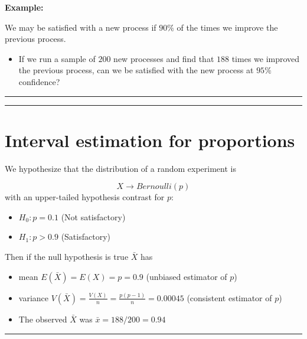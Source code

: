 \documentclass[
]{book}
\providecommand{\tightlist}{%
  \setlength{\itemsep}{0pt}\setlength{\parskip}{0pt}}
\begin{document}
\textbf{Example:}

We may be satisfied with a new process if \(90\%\) of the times we improve the previous process.

\begin{itemize}
\tightlist
\item
  If we run a sample of \(200\) new processes and find that \(188\) times we improved the previous process, can we be satisfied with the new process at \(95\%\) confidence?
\end{itemize}

\begin{center}\rule{0.5\linewidth}{0.5pt}\end{center}

\begin{center}\rule{0.5\linewidth}{0.5pt}\end{center}

\hypertarget{interval-estimation-for-proportions-4}{%
\section{Interval estimation for proportions}\label{interval-estimation-for-proportions-4}}

We hypothesize that the distribution of a random experiment is

\[X \rightarrow Bernoulli (p)\]
with an upper-tailed hypothesis contrast for \(p\):

\begin{itemize}
\tightlist
\item
  \(H_0: p=0.1\) (Not satisfactory)
\item
  \(H_1: p> 0.9\) (Satisfactory)
\end{itemize}

Then if the null hypothesis is true \(\bar{X}\) has

\begin{itemize}
\item
  mean \(E(\bar{X})=E(X)=p=0.9\) (unbiased estimator of \(p\))\\
\item
  variance \(V(\bar{X})=\frac{V(X)}{n}=\frac{p(p-1)}{n}=0.00045\) (consistent estimator of \(p\))
\item
  The observed \(\bar{X}\) was \(\bar{x}=188/200=0.94\)
\end{itemize}

\begin{center}\rule{0.5\linewidth}{0.5pt}\end{center}
\end{document}

